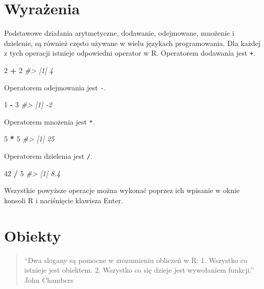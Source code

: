 \documentclass[paper=6in:9in,pagesize=pdftex,headinclude=on,footinclude=on,10pt]{scrbook}
\newenvironment{Shaded}{\begin{snugshade}}{\end{snugshade}}
\newcommand{\CommentTok}[1]{\textcolor[rgb]{0.56,0.35,0.01}{\textit{#1}}}
\newcommand{\DecValTok}[1]{\textcolor[rgb]{0.00,0.00,0.81}{#1}}
\newcommand{\OperatorTok}[1]{\textcolor[rgb]{0.81,0.36,0.00}{\textbf{#1}}}
\newcommand{\StringTok}[1]{\textcolor[rgb]{0.31,0.60,0.02}{#1}}
\begin{document}
\hypertarget{wyrazenia}{%
\section{Wyrażenia}\label{wyrazenia}}

Podstawowe działania arytmetyczne, dodawanie, odejmowane, mnożenie i dzielenie, są również często używane w wielu językach programowania.
Dla każdej z tych operacji istnieje odpowiedni operator w R.
Operatorem dodawania jest \texttt{+}.

\begin{Shaded}
\begin{Highlighting}[]
\DecValTok{2} \OperatorTok{+}\StringTok{ }\DecValTok{2}
\CommentTok{#> [1] 4}
\end{Highlighting}
\end{Shaded}

Operatorem odejmowania jest \texttt{-}.

\begin{Shaded}
\begin{Highlighting}[]
\DecValTok{1} \OperatorTok{-}\StringTok{ }\DecValTok{3}
\CommentTok{#> [1] -2}
\end{Highlighting}
\end{Shaded}

Operatorem mnożenia jest \texttt{*}.

\begin{Shaded}
\begin{Highlighting}[]
\DecValTok{5} \OperatorTok{*}\StringTok{ }\DecValTok{5}
\CommentTok{#> [1] 25}
\end{Highlighting}
\end{Shaded}

Operatorem dzielenia jest \texttt{/}.

\begin{Shaded}
\begin{Highlighting}[]
\DecValTok{42} \OperatorTok{/}\StringTok{ }\DecValTok{5}
\CommentTok{#> [1] 8.4}
\end{Highlighting}
\end{Shaded}

Wszystkie powyższe operacje można wykonać poprzez ich wpisanie w oknie konsoli R i naciśnięcie klawisza Enter.

\hypertarget{obiekty}{%
\section{Obiekty}\label{obiekty}}

\begin{quote}
``Dwa slogany są pomocne w zrozumieniu obliczeń w R: 1. Wszystko co istnieje jest obiektem. 2. Wszystko co się dzieje jest wywołaniem funkcji.'' John Chambers
\end{quote}
\end{document}
